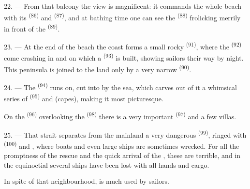 22. --- From that balcony the view is magnificent: it commands the whole
beach with its  \textsuperscript{(86)} and 
\textsuperscript{(87)}, and at bathing time one can see the 
\textsuperscript{(88)} frolicking merrily in front of the 
\textsuperscript{(89)}.

23. --- At the end of the beach the coast forms a small rocky
 \textsuperscript{(91)}, where the  \textsuperscript{(92)}
come crashing in and on which a  \textsuperscript{(93)} is built,
showing sailors their way by night. This peninsula is joined to the land
only by a very narrow  \textsuperscript{(90)}.

\VUsaut{3.0mm}
\VUsaut{3.0mm}

24. --- The  \textsuperscript{(94)} runs on, cut into by the sea, which
carves out of it a whimsical series of  \textsuperscript{(95)} and
 (capes), making it most picturesque.

On the  \textsuperscript{(96)} overlooking the 
\textsuperscript{(98)} there is a very important  \textsuperscript{(97)} and a
few villas.

25. --- That strait separates from the mainland a very dangerous
 \textsuperscript{(99)}, ringed with  \textsuperscript{(100)} and
, where boats and even large ships are sometimes wrecked. For
all the promptness of the rescue and the quick arrival of the
, these  are terrible, and in the
equinoctial  several ships have been lost with all hands and
cargo.

In spite of that neighbourhood,  is much used by sailors.
\VUsaut{6.0mm}
\VUfilet{22mm}
